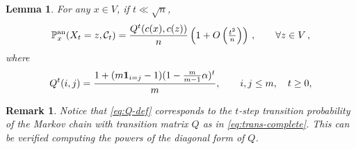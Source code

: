 \documentclass[11pt,oneside]{amsart}
\numberwithin{equation}{section}  %
\theoremstyle{plain}
\newtheorem{lemma}[theorem]{Lemma}
\newtheorem{remark}[theorem]{Remark}
\newcommand{\p}{\mathbb{P}}
\newcommand{\one}{\textup{\textbf{1}}}
\newcommand{\pan}{\p^{\textup{an}}}
\newcommand{\semi}{{Q}}
\begin{document}
\begin{lemma} \label{lemma:annealed-law}
For any $x\in V$, if $t \ll \sqrt{n}$,
\begin{equation}
	\pan_x(X_t=z,\mathcal{C}_t)=\frac{\semi^t(c(x),c(z))}{n}\left(1+O\left(\tfrac{t^2}{n}\right)\right)\,,\qquad \forall z\in V\,,
\end{equation}
where 
\begin{equation} \label{eq:Q-def}
	\semi^ t(i,j) = \frac{1+(m\one_{i=j}-1)(1-\frac{m}{m-1}\alpha)^{t}}{m}, \qquad i,j \le m, \quad t\ge0,
\end{equation}

\end{lemma}
\begin{remark}
    Notice that \eqref{eq:Q-def} corresponds to the $t$-step transition probability of the Markov chain with transition matrix $Q$ as in \eqref{eq:trans-complete}. This can be verified computing the powers of the diagonal form of $Q$.
\end{remark}
\end{document}

